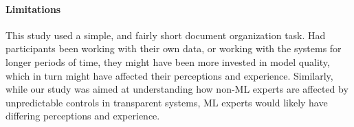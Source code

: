 \paragraph{Limitations}
This study used a simple, and fairly short document organization task. Had participants been working with their own data, or working with the systems for longer periods of time, they might have been more invested in model quality, which in turn might have affected their perceptions and experience. Similarly, while our study was aimed at understanding how non-ML experts are affected by unpredictable controls in transparent systems, ML experts would likely have differing perceptions and experience.



